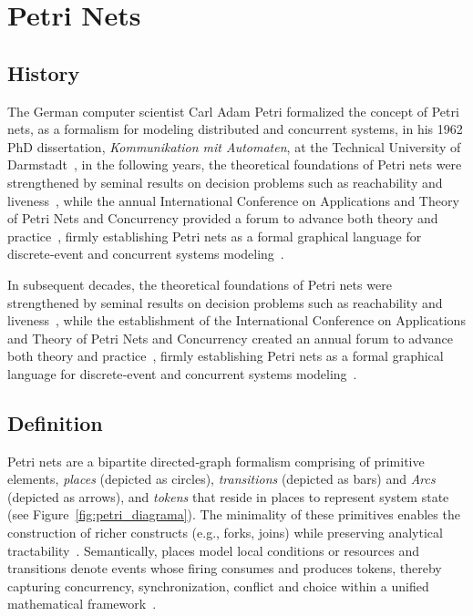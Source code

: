 \section{Petri Nets}
\label{sec:petri_nets}


\subsection{History}
\label{subsec:history}
The German computer scientist Carl Adam Petri formalized the concept of  Petri nets, as a formalism for modeling distributed and concurrent systems, in his 1962 PhD dissertation, \emph{Kommunikation mit Automaten}, at the Technical University of Darmstadt~\cite{adamCarlPetri}, in the following years, the theoretical foundations of Petri nets were strengthened by seminal results on decision problems such as reachability and liveness~\cite{murata}, while the annual International Conference on Applications and Theory of Petri Nets and Concurrency provided a forum to advance both theory and practice~\cite{ICPN1980}, firmly establishing Petri nets as a formal graphical language for discrete‐event and concurrent systems modeling~\cite{WikiPetriNet2025}.


In subsequent decades, the theoretical foundations of Petri nets were strengthened by seminal results on decision problems such as reachability and liveness~\cite{murata}, while the establishment of the International Conference on Applications and Theory of Petri Nets and Concurrency created an annual forum to advance both theory and practice~\cite{ICPN1980}, firmly establishing Petri nets as a formal graphical language for discrete‐event and concurrent systems modeling~\cite{WikiPetriNet2025}.

\subsection{Definition}
\label{subsec:definition}



Petri nets are a bipartite directed‐graph formalism comprising of primitive elements, \emph{places} (depicted as circles), \emph{transitions} (depicted as bars) and \emph{Arcs} (depicted as arrows), and \emph{tokens} that reside in places to represent system state (see Figure~\ref{fig:petri_diagrama}). The minimality of these primitives enables the construction of richer constructs (e.g., forks, joins) while preserving analytical tractability~\cite{50-years}. Semantically, places model local conditions or resources and transitions denote events whose firing consumes and produces tokens, thereby capturing concurrency, synchronization, conflict and choice within a unified mathematical framework~\cite{50-years}. 

